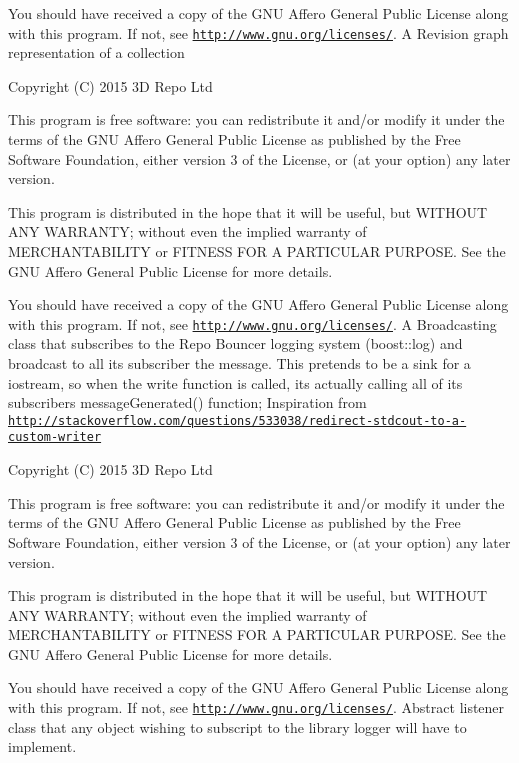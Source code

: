 You should have received a copy of the G\+N\+U Affero General Public License along with this program. If not, see \href{http://www.gnu.org/licenses/}{\tt http\+://www.\+gnu.\+org/licenses/}. A Revision graph representation of a collection

Copyright (C) 2015 3\+D Repo Ltd

This program is free software\+: you can redistribute it and/or modify it under the terms of the G\+N\+U Affero General Public License as published by the Free Software Foundation, either version 3 of the License, or (at your option) any later version.

This program is distributed in the hope that it will be useful, but W\+I\+T\+H\+O\+U\+T A\+N\+Y W\+A\+R\+R\+A\+N\+T\+Y; without even the implied warranty of M\+E\+R\+C\+H\+A\+N\+T\+A\+B\+I\+L\+I\+T\+Y or F\+I\+T\+N\+E\+S\+S F\+O\+R A P\+A\+R\+T\+I\+C\+U\+L\+A\+R P\+U\+R\+P\+O\+S\+E. See the G\+N\+U Affero General Public License for more details.

You should have received a copy of the G\+N\+U Affero General Public License along with this program. If not, see \href{http://www.gnu.org/licenses/}{\tt http\+://www.\+gnu.\+org/licenses/}. A Broadcasting class that subscribes to the Repo Bouncer logging system (boost\+::log) and broadcast to all its subscriber the message. This pretends to be a sink for a iostream, so when the write function is called, it\textquotesingle{}s actually calling all of it\textquotesingle{}s subscriber\textquotesingle{}s message\+Generated() function; Inspiration from \href{http://stackoverflow.com/questions/533038/redirect-stdcout-to-a-custom-writer}{\tt http\+://stackoverflow.\+com/questions/533038/redirect-\/stdcout-\/to-\/a-\/custom-\/writer}

Copyright (C) 2015 3\+D Repo Ltd

This program is free software\+: you can redistribute it and/or modify it under the terms of the G\+N\+U Affero General Public License as published by the Free Software Foundation, either version 3 of the License, or (at your option) any later version.

This program is distributed in the hope that it will be useful, but W\+I\+T\+H\+O\+U\+T A\+N\+Y W\+A\+R\+R\+A\+N\+T\+Y; without even the implied warranty of M\+E\+R\+C\+H\+A\+N\+T\+A\+B\+I\+L\+I\+T\+Y or F\+I\+T\+N\+E\+S\+S F\+O\+R A P\+A\+R\+T\+I\+C\+U\+L\+A\+R P\+U\+R\+P\+O\+S\+E. See the G\+N\+U Affero General Public License for more details.

You should have received a copy of the G\+N\+U Affero General Public License along with this program. If not, see \href{http://www.gnu.org/licenses/}{\tt http\+://www.\+gnu.\+org/licenses/}. Abstract listener class that any object wishing to subscript to the library logger will have to implement.

